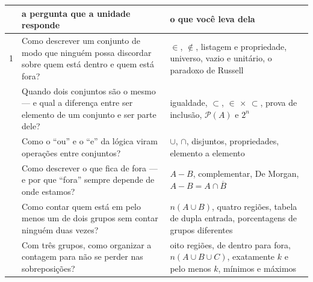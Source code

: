 \begin{center}\small
\renewcommand{\arraystretch}{1.12}
\begin{tabular}{c>{\raggedright\arraybackslash}p{6.4cm}>{\raggedright\arraybackslash}p{6.0cm}}\toprule
& \textbf{a pergunta que a unidade responde} & \textbf{o que você leva dela}\\\midrule
1 & Como descrever um conjunto de modo que ninguém possa discordar sobre quem está dentro e quem está fora? & $\in$, $\notin$, listagem e propriedade, universo, vazio e unitário, o paradoxo de Russell\\\fino
2 & Quando dois conjuntos são o mesmo — e qual a diferença entre ser elemento de um conjunto e ser parte dele? & igualdade, $\subset$, $\in$ $\times$ $\subset$, prova de inclusão, $\mathcal{P}(A)$ e $2^n$\\\fino
3 & Como o \enquote{ou} e o \enquote{e} da lógica viram operações entre conjuntos? & $\cup$, $\cap$, disjuntos, propriedades, elemento a elemento\\\fino
4 & Como descrever o que fica de fora — e por que \enquote{fora} sempre depende de onde estamos? & $A-B$, complementar, De Morgan, $A-B=A\cap\overline{B}$\\\fino
5 & Como contar quem está em pelo menos um de dois grupos sem contar ninguém duas vezes? & $n(A\cup B)$, quatro regiões, tabela de dupla entrada, porcentagens de grupos diferentes\\\fino
6 & Com três grupos, como organizar a contagem para não se perder nas sobreposições? & oito regiões, de dentro para fora, $n(A\cup B\cup C)$, exatamente $k$ e pelo menos $k$, mínimos e máximos\\\bottomrule
\end{tabular}
\end{center}

